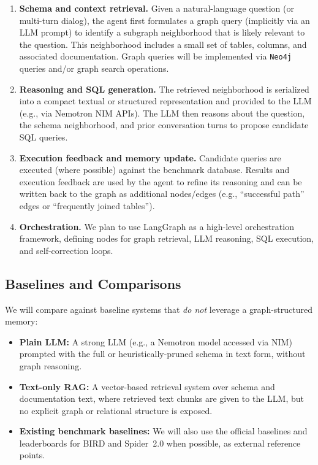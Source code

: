\documentclass[11pt]{article}
\begin{document}
\begin{enumerate}[leftmargin=*]
  \item \textbf{Schema and context retrieval.}
  Given a natural-language question (or multi-turn dialog), the agent first formulates a graph query (implicitly via an LLM prompt) to identify a subgraph neighborhood that is likely relevant to the question.
  This neighborhood includes a small set of tables, columns, and associated documentation.
  Graph queries will be implemented via \texttt{Neo4j} queries and/or graph search operations.
  \item \textbf{Reasoning and SQL generation.}
  The retrieved neighborhood is serialized into a compact textual or structured representation and provided to the LLM (e.g., via Nemotron NIM APIs).
  The LLM then reasons about the question, the schema neighborhood, and prior conversation turns to propose candidate SQL queries.
  \item \textbf{Execution feedback and memory update.}
  Candidate queries are executed (where possible) against the benchmark database.
  Results and execution feedback are used by the agent to refine its reasoning and can be written back to the graph as additional nodes/edges (e.g., ``successful path'' edges or ``frequently joined tables'').
  \item \textbf{Orchestration.}
  We plan to use LangGraph as a high-level orchestration framework, defining nodes for graph retrieval, LLM reasoning, SQL execution, and self-correction loops.
\end{enumerate}

\subsection{Baselines and Comparisons}

We will compare against baseline systems that \emph{do not} leverage a graph-structured memory:

\begin{itemize}[leftmargin=*]
  \item \textbf{Plain LLM:} A strong LLM (e.g., a Nemotron model accessed via NIM) prompted with the full or heuristically-pruned schema in text form, without graph reasoning.
  \item \textbf{Text-only RAG:} A vector-based retrieval system over schema and documentation text, where retrieved text chunks are given to the LLM, but no explicit graph or relational structure is exposed.
  \item \textbf{Existing benchmark baselines:} We will also use the official baselines and leaderboards for BIRD and Spider~2.0 when possible, as external reference points.
\end{itemize}
\end{document}
